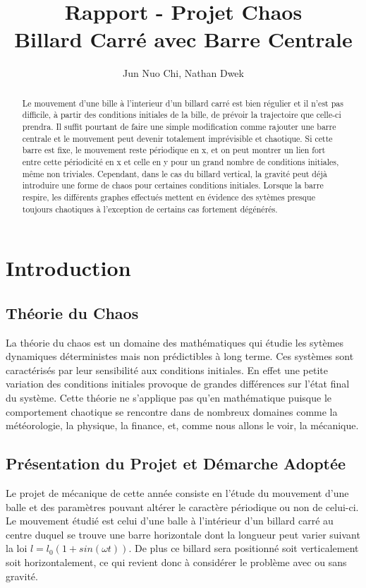 \documentclass[a4paper]{report}
\title{Rapport - Projet Chaos\\Billard Carré avec Barre Centrale}
\author{Jun Nuo Chi, Nathan Dwek}
\begin{document}
\maketitle
\tableofcontents
\begin{abstract}

Le mouvement d'une bille à l'interieur d'un billard carré est bien régulier et il n'est pas difficile, à partir des conditions initiales de la bille, de prévoir la trajectoire que celle-ci prendra. Il suffit pourtant de faire une simple modification comme rajouter une barre centrale et le mouvement peut devenir totalement imprévisible et chaotique.
Si cette barre est fixe, le mouvement reste périodique en x, et on peut montrer un lien fort entre cette périodicité en x et celle en y pour un grand nombre de conditions initiales, même non triviales. Cependant, dans le cas du billard vertical, la gravité peut déjà introduire une forme de chaos pour certaines conditions initiales. Lorsque la barre respire, les différents graphes effectués mettent en évidence des sytèmes presque toujours chaotiques à l'exception de certains cas fortement dégénérés.

\end{abstract}

\chapter{Introduction}

\section{Théorie du Chaos}
La théorie du chaos est un domaine des mathématiques qui étudie les sytèmes dynamiques déterministes mais non prédictibles à long terme. Ces systèmes sont caractérisés par leur sensibilité aux conditions initiales. En effet une petite variation des conditions initiales provoque de grandes différences sur l'état final du système. Cette théorie ne s'applique pas qu'en mathématique puisque le comportement chaotique se rencontre dans de nombreux domaines comme la météorologie, la physique, la finance, et, comme nous allons le voir, la mécanique.

\section{Présentation du Projet et Démarche Adoptée}
Le projet de mécanique de cette année consiste en l'étude du mouvement d'une balle et des paramètres pouvant altérer le caractère périodique ou non de celui-ci. Le mouvement étudié est celui d'une balle à l'intérieur d'un billard carré au centre duquel se  trouve une barre horizontale dont la longueur peut varier suivant la loi \(l=l_0(1+sin(\omega t)) \). De plus ce billard sera positionné soit verticalement soit horizontalement, ce qui revient donc à considérer le problème avec ou sans gravité.
\end{document}
